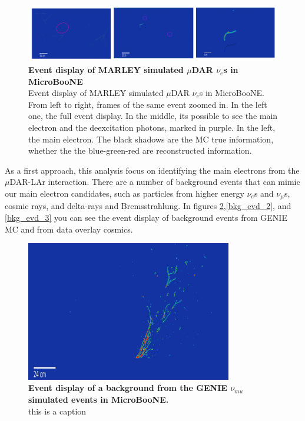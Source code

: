 \begin{figure}[h!]
    \centering
    \includegraphics[width=200mm]{Figures/signal_evd_3.jpeg}
    \caption[Event display of MARLEY simulated $\mu$DAR $\nu_e$s in MicroBooNE]{{\textbf{Event display of MARLEY simulated $\mu$DAR $\nu_e$s in MicroBooNE}}\\ Event display of MARLEY simulated $\mu$DAR $\nu_e$s in MicroBooNE. From left to right, frames of the same event zoomed in. In the left one, the full event display. In the middle, its possible to see the main electron and the deexcitation photons, marked in purple. In the left, the main electron. The black shadows are the MC true information, whether the the blue-green-red are reconstructed information.}
    \label{signal_evd_3}
\end{figure}

As a first approach, this analysis focus on identifying the main electrons from the $\mu$DAR-LAr interaction. 
There are a number of background events that can mimic our main electron candidates, such as particles from higher energy $\nu_e$s and $\nu_{\mu}$s, cosmic rays, and delta-rays and Bremsstrahlung. In figures \ref{bkg_evd_1},\ref{bkg_evd_2}, and \ref{bkg_evd_3}  you can see the event display of background events from GENIE MC and from data overlay cosmics. 

\begin{figure}[h!]
    \centering
    \includegraphics[width=90mm]{Figures/shower_evd_1.png}
    \caption[Event display of a background from the GENIE $\nu_{mu}$ simulated events in MicroBooNE.]{{\textbf{Event display of a background from the GENIE $\nu_{mu}$ simulated events in MicroBooNE.}}\\ this is a caption}
    \label{bkg_evd_1}
\end{figure}

